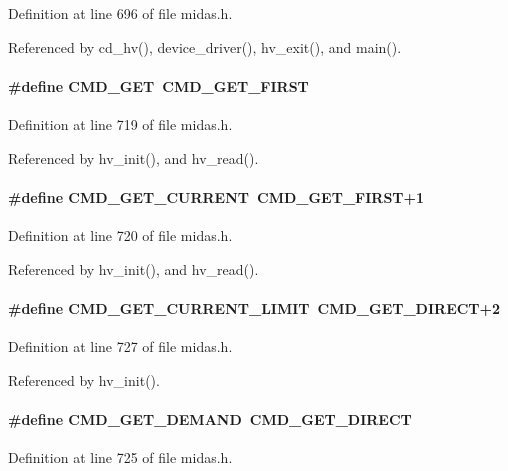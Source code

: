 Definition at line 696 of file midas.h.

Referenced by cd\_\-hv(), device\_\-driver(), hv\_\-exit(), and main().
\paragraph[{CMD\_\-GET}]{\setlength{\rightskip}{0pt plus 5cm}\#define CMD\_\-GET~CMD\_\-GET\_\-FIRST}\hfill\label{group__err26_ga39f82f93564bba7925fd849ce7967a2b}


Definition at line 719 of file midas.h.

Referenced by hv\_\-init(), and hv\_\-read().
\paragraph[{CMD\_\-GET\_\-CURRENT}]{\setlength{\rightskip}{0pt plus 5cm}\#define CMD\_\-GET\_\-CURRENT~CMD\_\-GET\_\-FIRST+1}\hfill\label{group__err26_ga3578ee798d04c6279a03f61fe70079e0}


Definition at line 720 of file midas.h.

Referenced by hv\_\-init(), and hv\_\-read().
\paragraph[{CMD\_\-GET\_\-CURRENT\_\-LIMIT}]{\setlength{\rightskip}{0pt plus 5cm}\#define CMD\_\-GET\_\-CURRENT\_\-LIMIT~CMD\_\-GET\_\-DIRECT+2}\hfill\label{group__err26_ga3e10107388c1ca0db3c4518f7f671bda}


Definition at line 727 of file midas.h.

Referenced by hv\_\-init().
\paragraph[{CMD\_\-GET\_\-DEMAND}]{\setlength{\rightskip}{0pt plus 5cm}\#define CMD\_\-GET\_\-DEMAND~CMD\_\-GET\_\-DIRECT}\hfill\label{group__err26_ga24de488cd06cc543d6030027ca206a10}


Definition at line 725 of file midas.h.

